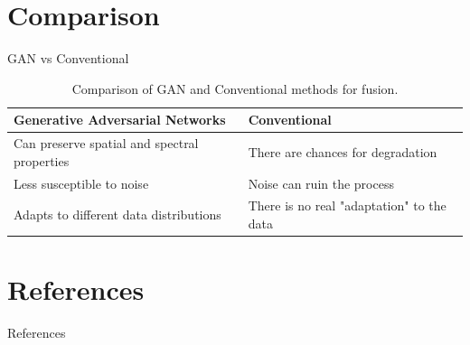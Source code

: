 \documentclass{beamer}
\begin{document}
\section{Comparison}
\begin{frame}{GAN vs Conventional}
    \begin{table}
        \centering
        \begin{tabular}{|| p{5cm} | p{5cm} ||} 
             \hline
             \textbf{Generative Adversarial Networks} & \textbf{Conventional} \\ [0.5ex] 
             \hline\hline
             Can preserve spatial and spectral properties & There are chances for degradation \\ 
             \hline
             Less susceptible to noise & Noise can ruin the process \\
             \hline
             Adapts to different data distributions & There is no real "adaptation" to the data \\
             \hline
        \end{tabular}
        \caption{Comparison of GAN and Conventional methods for fusion.}
        \label{table:tab-1}
    \end{table}
\end{frame}
\section{References}
\begin{frame}[allowframebreaks]{References}
        \printbibliography
\end{frame}
\end{document}
